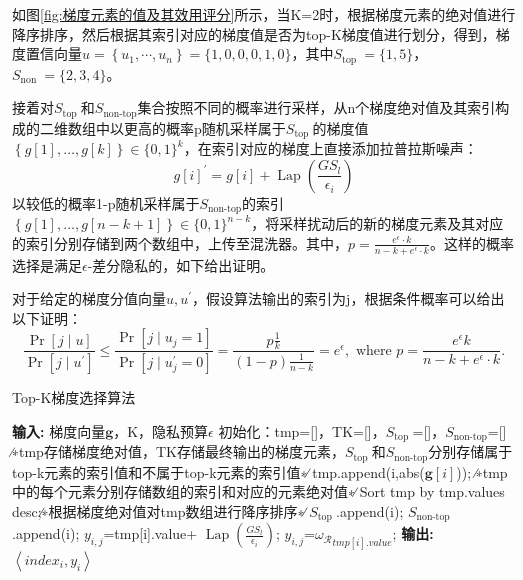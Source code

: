如图\ref{fig:梯度元素的值及其效用评分}所示，当K=2时，根据梯度元素的绝对值进行降序排序，然后根据其索引对应的梯度值是否为top-K梯度值进行划分，得到，梯度置信向量$u=\left\{u_{1}, \cdots, u_{n}\right\}=\{1,0,0,0,1,0\}$，其中$S_{\text {top }}=\{1,5\}$，$S_{\text {non }}=\{2,3,4\}$。

接着对$S_{\text {top }}$和$S_{\text {non-top}} $集合按照不同的概率进行采样，从n个梯度绝对值及其索引构成的二维数组中以更高的概率p随机采样属于$S_{\text {top }}$的梯度值$\left\{g[1], \ldots, g[k]\right\} \in\{0,1\}^{k}$，在索引对应的梯度上直接添加拉普拉斯噪声：
$$
g[i]^{\prime}=g[i]+ \operatorname{Lap}\left(\frac{GS_{l}}{\epsilon_{i}}\right)
$$
以较低的概率1-p随机采样属于$S_{\text {non-top}} $的索引$\left\{g[1], \ldots, g[n-k+1]\right\} \in\{0,1\}^{n-k}$，将采样扰动后的新的梯度元素及其对应的索引分别存储到两个数组中，上传至混洗器。其中，$p=\frac{e^{\epsilon} \cdot k}{n-k+e^{\epsilon} \cdot k}$。这样的概率选择是满足$\epsilon$-差分隐私的，如下给出证明。

\begin{theorem}\label{隐私性证明-topk}
对于给定的梯度分值向量$u, u^{\prime}$，假设算法输出的索引为j，根据条件概率可以给出以下证明：
$$
\frac{\operatorname{Pr}[j \mid u]}{\operatorname{Pr}\left[j \mid u^{\prime}\right]} \leq \frac{\operatorname{Pr}\left[j \mid u_{j}=1\right]}{\operatorname{Pr}\left[j \mid u_{j}^{\prime}=0\right]}=\frac{p \frac{1}{k}}{(1-p) \frac{1}{n-k}}=e^{\epsilon}, \text { where } p=\frac{e^{\epsilon} k}{n-k+e^{\epsilon} \cdot k}.
$$
\end{theorem}

\begin{algorithm}[!htb]
	\caption{Top-K梯度选择算法}
	\label{Top-K梯度选择算法}
	\begin{algorithmic}[1]
		\footnotesize
		\STATE \textbf{输入:} 梯度向量$\mathbf{g}$，K，隐私预算$\epsilon$
		\STATE 初始化：tmp=[]，TK=[]，$S_{\text {top }}$=[]，$S_{\text {non-top}}$=[] ∕∗tmp存储梯度绝对值，TK存储最终输出的梯度元素，$S_{\text {top }}$和$S_{\text {non-top}}$分别存储属于top-k元素的索引值和不属于top-k元素的索引值∗∕
			\STATE tmp.append({i,abs($\mathbf{g}[i]$)}); ∕∗tmp中的每个元素分别存储数组的索引和对应的元素绝对值∗∕
		\ENDFOR
		\STATE Sort tmp by tmp.values desc;∕∗根据梯度绝对值对tmp数组进行降序排序∗∕
				\STATE $S_{\text {top }}$.append(i);
				\ELSE
				\STATE $S_{\text {non-top }}$.append(i);
				\ENDIF 
		\ENDFOR
				\STATE $y_{i, j}$=tmp[i].value+ $\operatorname{Lap}\left(\frac{GS_{l}}{\epsilon_{i}}\right)$;
				\ELSE
				\STATE $y_{i, j}$=${\omega_{\mathcal{R}}}_{tmp[i].value}$;
				\ENDIF
		\ENDFOR
		\STATE \textbf{输出:} $\left\langle index_{i}, y_{i}\right\rangle$
	\end{algorithmic}
\end{algorithm}

